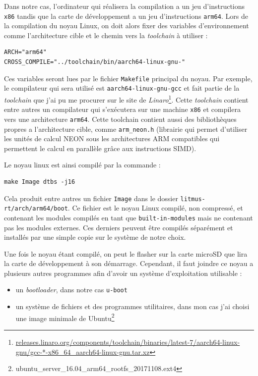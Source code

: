 Dans notre cas, l'ordinateur qui réalisera la compilation a un jeu d'instructions \texttt{x86} tandis que la carte de développement a un jeu d'instructions \texttt{arm64}. Lors de la compilation du noyau Linux, on doit alors fixer des variables d’environnement comme l'architecture cible et le chemin vers la \textit{toolchain} à utiliser : 
\begin{lstlisting}[style=command, caption=Variables pour la compilation croisée du noyau Linux]
ARCH="arm64"
CROSS_COMPILE="../toolchain/bin/aarch64-linux-gnu-"
\end{lstlisting}

Ces variables seront lues par le fichier \texttt{Makefile} principal du noyau. Par exemple, le compilateur qui sera utilisé est \texttt{aarch64-linux-gnu-gcc} et fait partie de la \textit{toolchain} que j'ai pu me procurer sur le site de \textit{Linaro}\footnote{\href{https://releases.linaro.org/components/toolchain/binaries/latest-7/aarch64-linux-gnu/gcc-*-x86\_64\_aarch64-linux-gnu.tar.xz}{releases.linaro.org/components/toolchain/binaries/latest-7/aarch64-linux-gnu/gcc-*-x86\_64\_aarch64-linux-gnu.tar.xz}}.
Cette \textit{toolchain} contient entre autres un compilateur qui s’exécutera sur une machine \texttt{x86} et compilera vers une architecture \texttt{arm64}. Cette toolchain contient aussi des bibliothèques propres a l'architecture cible, comme \texttt{arm\_neon.h} (librairie qui permet d'utiliser les unités de calcul NEON sous les architectures ARM compatibles qui permettent le calcul en parallèle grâce aux instructions SIMD).

Le noyau linux est ainsi compilé par la commande :
\begin{lstlisting}[style=command, caption=Compilation croisée du noyau Linux]
    make Image dtbs -j16
\end{lstlisting}
Cela produit entre autres un fichier \texttt{Image} dans le dossier \texttt{litmus-rt/arch/arm64/boot}. Ce fichier est le noyau Linux compilé, non compressé, et contenant les modules compilés en tant que \texttt{built-in-modules} mais ne contenant pas les modules externes. Ces derniers peuvent être compilés séparément et installés par une simple copie sur le système de notre choix. 

Une fois le noyau étant compilé, on peut le flasher sur la carte microSD que lira la carte de développement à son démarrage. Cependant, il faut joindre ce noyau a plusieurs autres programmes afin d'avoir un système d'exploitation utilisable : 
\begin{itemize}
    \item un \textit{bootloader}, dans notre cas \texttt{u-boot}
    \item un système de fichiers et des programmes utilitaires, dans mon cas j'ai choisi une image minimale de Ubuntu\footnote{ubuntu\_server\_16.04\_arm64\_rootfs\_20171108.ext4}
\end{itemize}

